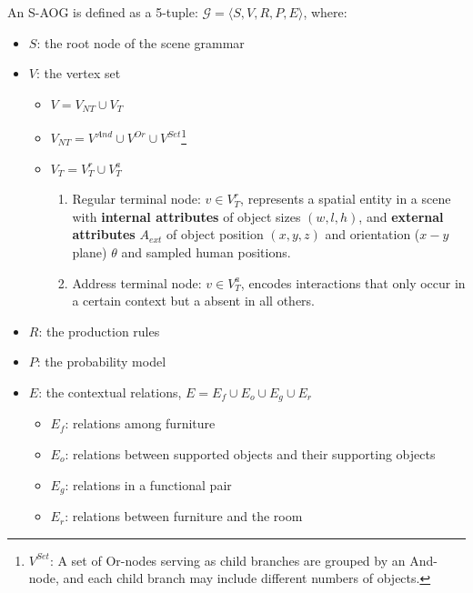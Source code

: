 \documentclass[10pt]{article}
\begin{document}
An S-AOG is defined as a 5-tuple: $\mathcal{G} = \langle S, V, R, P, E \rangle$,
where:
%
\begin{itemize}
  \item $S$: the root node of the scene grammar
  \item $V$: the vertex set
    \begin{itemize}
      \item $V = V_{NT} \cup V_T$
      \item $V_{NT} = V^{And} \cup V^{Or} \cup V^{Set}$\footnote{$V^{Set}$: A
          set of Or-nodes serving as child branches are grouped by an And-node,
          and each child branch may include different numbers of objects.}
      \item $V_T = V^r_T \cup V^a_T$
        \begin{enumerate}
          \item Regular terminal node: $v \in V^r_T$, represents a spatial
            entity in a scene with \textbf{internal attributes} of object sizes
            $(w, l, h)$, and \textbf{external attributes} $A_{ext}$ of
            object position $(x, y, z)$ and orientation ($x - y$ plane)
            $\theta$ and sampled human positions.
          \item Address terminal node: $v \in V^a_T$, encodes interactions that
            only occur in a certain context but a absent in all others.
        \end{enumerate}
    \end{itemize}
  \item $R$: the production rules
  \item $P$: the probability model
  \item $E$: the contextual relations, $E = E_f \cup E_o \cup E_g \cup E_r$
    \begin{itemize}
      \item $E_f$: relations among furniture
      \item $E_o$: relations between supported objects and their supporting
        objects
      \item $E_g$: relations in a functional pair
      \item $E_r$: relations between furniture and the room
    \end{itemize}
\end{itemize}
\end{document}
